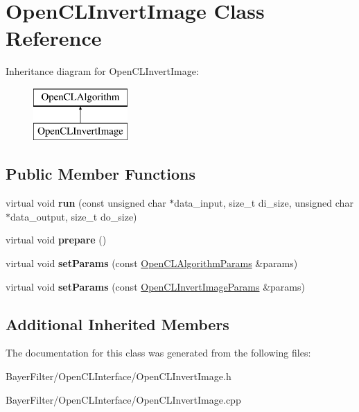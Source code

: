 \hypertarget{class_open_c_l_invert_image}{\section{Open\-C\-L\-Invert\-Image Class Reference}
\label{class_open_c_l_invert_image}
}
Inheritance diagram for Open\-C\-L\-Invert\-Image\-:\begin{figure}[H]
\begin{center}
\leavevmode
\includegraphics[height=2.000000cm]{class_open_c_l_invert_image}
\end{center}
\end{figure}
\subsection*{Public Member Functions}
\begin{DoxyCompactItemize}
\item 
\hypertarget{class_open_c_l_invert_image_a059e0e9a6338a90834c487391b0cdc10}{virtual void {\bfseries run} (const unsigned char $\ast$data\-\_\-input, size\-\_\-t di\-\_\-size, unsigned char $\ast$data\-\_\-output, size\-\_\-t do\-\_\-size)}\label{class_open_c_l_invert_image_a059e0e9a6338a90834c487391b0cdc10}

\item 
\hypertarget{class_open_c_l_invert_image_a0345a99e4f093afdfb568a6c6fbc75ad}{virtual void {\bfseries prepare} ()}\label{class_open_c_l_invert_image_a0345a99e4f093afdfb568a6c6fbc75ad}

\item 
\hypertarget{class_open_c_l_invert_image_a69eb33ee17f140ecb32e0f20ce2e0f10}{virtual void {\bfseries set\-Params} (const \hyperlink{class_open_c_l_algorithm_params}{Open\-C\-L\-Algorithm\-Params} \&params)}\label{class_open_c_l_invert_image_a69eb33ee17f140ecb32e0f20ce2e0f10}

\item 
\hypertarget{class_open_c_l_invert_image_acb874202d84e1a3976034b86b9440d30}{virtual void {\bfseries set\-Params} (const \hyperlink{class_open_c_l_invert_image_params}{Open\-C\-L\-Invert\-Image\-Params} \&params)}\label{class_open_c_l_invert_image_acb874202d84e1a3976034b86b9440d30}

\end{DoxyCompactItemize}
\subsection*{Additional Inherited Members}


The documentation for this class was generated from the following files\-:\begin{DoxyCompactItemize}
\item 
Bayer\-Filter/\-Open\-C\-L\-Interface/Open\-C\-L\-Invert\-Image.\-h\item 
Bayer\-Filter/\-Open\-C\-L\-Interface/Open\-C\-L\-Invert\-Image.\-cpp\end{DoxyCompactItemize}
